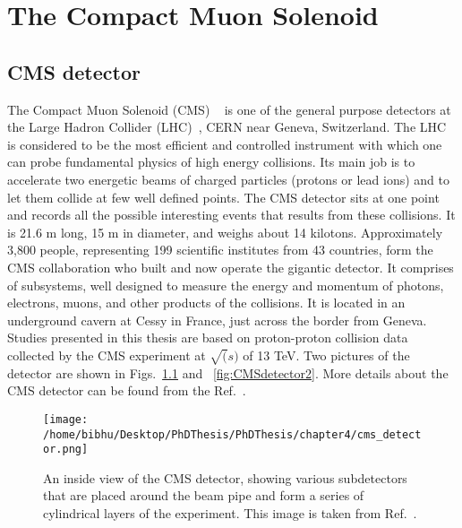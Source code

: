  
\chapter{The Compact Muon Solenoid \label{The Compact Muon Solenoid}}

\section{CMS detector}
The Compact Muon Solenoid (CMS) ~\cite{cms-jinst} is one of the general purpose detectors at the Large Hadron Collider (LHC)~\cite{theLHC}, CERN near Geneva, Switzerland. The LHC is considered to be the most efficient and controlled instrument with which one can probe fundamental physics of high energy collisions. Its main job is to accelerate two energetic beams of charged particles (protons or lead ions) and to let them collide at few well defined points. The CMS detector sits at one point and records all the possible interesting events that results from these collisions. It is 21.6 m long, 15 m in diameter, and weighs about 14 kilotons. Approximately 3,800 people, representing 199 scientific institutes from 43 countries, form the CMS collaboration who built and now operate the gigantic detector. It comprises of subsystems, well designed to measure the energy and momentum of photons, electrons, muons, and other products of the collisions. It is located in an underground cavern at Cessy in France, just across the border from Geneva. Studies presented in this thesis are based on proton-proton collision data collected by the CMS experiment at $\sqrt(s)$ of 13 TeV. Two pictures of the detector are shown in Figs.~\ref{fig:CMSdetector1Thesis} and ~\ref{fig:CMSdetector2}. More details about the CMS detector can be found from the Ref.~\cite{physics-tdr-8.1, physics-tdr-8.2}.
\begin{figure}[h]
    \centering
    \texttt{[image: /home/bibhu/Desktop/PhDThesis/PhDThesis/chapter4/cms\_detector.png]}
    \caption{ \small An inside view of the CMS detector, showing various subdetectors that are placed around the beam pipe and form a series of cylindrical layers of the experiment. This image is taken from Ref.~\cite{cms-det}.}
    \label{fig:CMSdetector1Thesis}
\end{figure}



